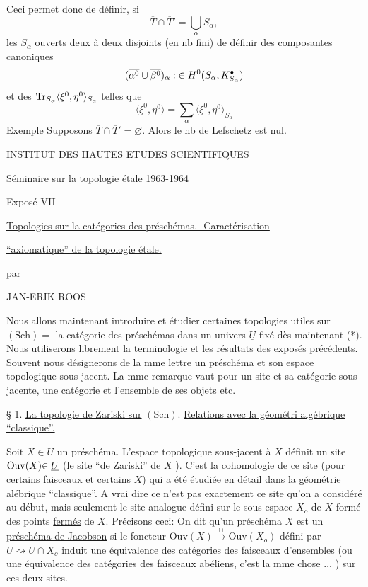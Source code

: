 Ceci permet donc de définir, si
\[
\overline{T}\cap\overline{T}'=\bigcup_\alpha S_\alpha,
\]
 les $S_\alpha$ ouverts deux à deux disjoints (en nb fini) de définir des composantes canoniques
\[
(\overline{\alpha^0}\cup\overline{\beta^0})_\alpha:
{{\in H^0(S_\alpha,K_{S_\alpha}^{\bullet})}}
\]
et des ${{\operatorname{Tr}_{S_\alpha}}}\langle\xi^0,\eta^0\rangle_{S_\alpha}$ telles que
\[
\langle\xi^0,\eta^0\rangle=\sum_\alpha\langle\xi^0,\eta^0\rangle_{S_\alpha}
\]
\uline{Exemple} Supposons $\overline{T}\cap\overline{T}'=\varnothing$. Alors le nb de Lefschetz est nul.
\begin{center}
INSTITUT DES HAUTES ETUDES SCIENTIFIQUES

Séminaire sur la topologie étale 1963-1964

Exposé VII

\uline{Topologies sur la catégories des préschémas.- Caractérisation}

\uline{``axiomatique'' de la topologie étale.}

par

JAN-ERIK ROOS
\end{center}

Nous allons maintenant introduire et étudier certaines topologies utiles sur $(\mathrm{Sch})=$ la catégorie des préschémas dans un univers $\underline{U}$ fixé dès maintenant (*). Nous utiliserons librement la terminologie et les résultats des exposés précédents. Souvent nous désignerons de la mme lettre un préschéma et son espace topologique sous-jacent. La mme remarque vaut pour un site et sa catégorie sous-jacente, une catégorie et l'ensemble de ses objets etc.

§ 1. \uline{La topologie de Zariski sur} $(\mathrm{Sch})$. \uline{Relations avec la géométri algébrique ``classique''.}

Soit $X\in\underline{U}$ un préschéma. L'espace topologique sous-jacent à $X$ définit un site $\mathrm{Ouv}(X){\in\underline{U}}$ (le site ``de Zariski'' de $X$ ). C'est la cohomologie de ce site (pour certains faisceaux et certains $X$) qui a été étudiée en détail dans la géométrie alébrique ``classique''. A vrai dire ce n'est pas exactement ce site qu'on a considéré au début, mais seulement le site analogue défini sur le sous-espace $X_o$ de $X$ formé des points \uline{fermés} de $X$. Précisons ceci: On dit qu'un préschéma $X$ est un \uline{préschéma de Jacobson} si le foncteur $\mathrm{Ouv}(X)\xrightarrow{\cap}\mathrm{Ouv}(X_o)$ défini par $U\rightsquigarrow U\cap X_o$ induit une équivalence des catégories des faisceaux d'ensembles (ou une équivalence des catégories des faisceaux abéliens, c'est la mme chose $\ldots$ ) sur ces deux sites.

